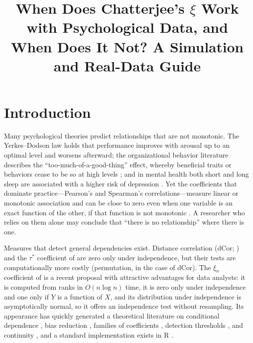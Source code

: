 \documentclass[man,mask,donotrepeattitle,floatsintext]{apa7}
\title{When Does Chatterjee's $\xi$ Work with Psychological Data, and When Does It Not? A Simulation and Real-Data Guide}
\begin{document}
\maketitle

\section{Introduction}

Many psychological theories predict relationships that are not monotonic. The Yerkes--Dodson law \parencite{yerkes1908} holds that performance improves with arousal up to an optimal level and worsens afterward; the organizational behavior literature describes the ``too-much-of-a-good-thing'' effect, whereby beneficial traits or behaviors cease to be so at high levels \parencite{pierce2013}; and in mental health both short and long sleep are associated with a higher risk of depression \parencite{zhai2015}. Yet the coefficients that dominate practice---Pearson's and Spearman's correlations---measure linear or monotonic association and can be close to zero even when one variable is an exact function of the other, if that function is not monotonic \parencite{chatterjee2021}. A researcher who relies on them alone may conclude that ``there is no relationship'' where there is one.

Measures that detect general dependencies exist. Distance correlation (dCor; \cite{szekely2007}) and the $\tau^*$ coefficient of \textcite{bergsma2014} are zero only under independence, but their tests are computationally more costly (permutation, in the case of dCor). The $\xi_n$ coefficient of \textcite{chatterjee2021} is a recent proposal with attractive advantages for data analysts: it is computed from ranks in $O(n\log n)$ time, it is zero only under independence and one only if $Y$ is a function of $X$, and its distribution under independence is asymptotically normal, so it offers an independence test without resampling. Its appearance has quickly generated a theoretical literature on conditional dependence \parencite{azadkia2021}, bias reduction \parencite{dalitz2024}, families of coefficients \parencite{gao2024}, detection thresholds \parencite{auddy2024}, and continuity \parencite{ansari2026,bucher2025}, and a standard implementation exists in R \parencite{chatterjee2023xicor}.
\end{document}
